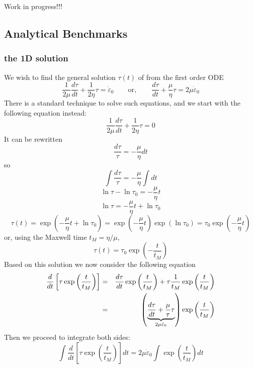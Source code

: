 
{\Large Work in progress!!!}


\subsection{Analytical Benchmarks}

\subsubsection{the 1D solution}
We wish to find the general solution $\tau(t)$ of from the first order ODE
\[
\frac{1}{2\mu} \frac{d\tau}{dt} + \frac{1}{2\eta} \tau = \dot\varepsilon_0
\qquad
\text{or},
\qquad
\frac{d\tau}{dt} + \frac{\mu}{\eta} \tau = 2\mu \dot\varepsilon_0
\]
There is a standard technique to solve such equations, and we start with the following equation instead:
\[
\frac{1}{2\mu} \frac{d\tau}{dt} + \frac{1}{2\eta} \tau = 0
\]
It can be rewritten
\[
\frac{d\tau}{\tau} = -\frac{\mu}{\eta} dt
\]
so
\[
\int \frac{d\tau}{\tau} = -\frac{\mu}{\eta} \int dt
\]
\[
\ln \tau - \ln \tau_0 = -\frac{\mu}{\eta} t 
\]
\[
\ln \tau = -\frac{\mu}{\eta} t  + \ln \tau_0
\]
\[
\tau(t) 
= \exp \left(  -\frac{\mu}{\eta} t  + \ln \tau_0 \right) 
= \exp \left(  -\frac{\mu}{\eta} t   \right)   \exp \left(  \ln \tau_0 \right) 
= \tau_0 \exp \left(  -\frac{\mu}{\eta} t   \right) 
\]
or, using the Maxwell time $t_M=\eta/\mu$,
\[
\tau(t) 
= \tau_0 \exp \left(  -\frac{t}{t_M}   \right) 
\]
Based on this solution we now 
consider the following equation
\begin{eqnarray}
\frac{d}{dt} \left[   \tau \exp\left( \frac{t}{t_M}   \right)  \right]
&=& 
\frac{d \tau}{dt}  \exp\left( \frac{t}{t_M}   \right)  +
\tau \frac{1}{t_M} \exp\left( \frac{t}{t_M}   \right)  \nonumber\\
&=& 
\left( \underbrace{\frac{d \tau}{dt} + \frac{\mu}{\tau} \tau}_{2\mu \dot\varepsilon_0}  \right)  \exp\left( \frac{t}{t_M}   \right)  \nonumber
\end{eqnarray}
Then we proceed to integrate both sides:
\[
\int \frac{d}{dt} \left[   \tau \exp\left( \frac{t}{t_M}   \right)  \right] dt
= 2\mu \dot\varepsilon_0 \int \exp\left( \frac{t}{t_M}   \right)  dt
\]

